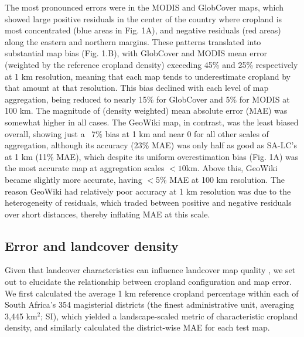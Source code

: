 \documentclass{pnastwo}
\begin{document}
\begin{article}

\linenumbers
The most pronounced errors were in the MODIS and GlobCover maps, which showed large positive residuals in the center of the country where cropland is most concentrated (blue areas in Fig. 1A), and negative residuals (red areas) along the eastern and northern margins.
These patterns translated into substantial map bias (Fig. 1.B), with GlobCover and MODIS mean error (weighted by the reference cropland density) exceeding 45\% and 25\% respectively at 1 km resolution, meaning that each map tends to underestimate cropland by that amount at that resolution. This bias declined with each level of map aggregation, being reduced to nearly 15\% for GlobCover and 5\% for MODIS at 100 km. The magnitude of (density weighted) mean absolute error (MAE) was somewhat higher in all cases. The GeoWiki map, in contrast, was the least biased overall, showing just a ~7\% bias at 1 km and near 0 for all other scales of aggregation, although its accuracy (23\% MAE) was only half as good as SA-LC's at 1 km (11\% MAE), which despite its uniform overestimation bias (Fig. 1A) was the most accurate map at aggregation scales $<10$km. Above this, GeoWiki became slightly more accurate, having $<$5\% MAE at 100 km resolution. The reason GeoWiki had relatively poor accuracy at 1 km resolution was due to the heterogeneity of residuals, which traded between positive and negative residuals over short distances, thereby inflating MAE at this scale.  

\subsection{Error and landcover density}
Given that landcover characteristics can influence landcover map quality \cite{see_improved_2015, estes_diylandcover:_2015, debats_generalized_????}, we set out to elucidate the relationship between cropland configuration and map error.  We first calculated the average 1 km reference cropland percentage within each of South Africa's 354 magisterial districts (the finest administrative unit, averaging 3,445 km$^2$; SI), which yielded a landscape-scaled metric of characteristic cropland density, and similarly calculated the district-wise MAE for each test map. 


\end{article}
\end{document}

